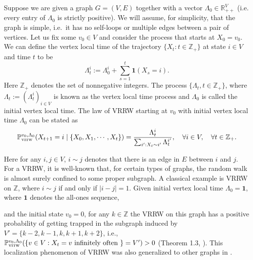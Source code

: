 \documentclass[a4paper, 11pt]{article}
\renewcommand{\P}{\mathbb{P}}
\newcommand{\Pvrrw}{\P_{\textnormal{vrrw}}}
\newcommand{\allone}{\mathbf{1}}
\newcommand{\ind}{\mathbf{1}}
\newif\ifva
\begin{document}
Suppose we are given a graph $G=(V, E)$ together with a vector $\Lambda_0 \in \mathbb{R}_{++}^V$
(i.e. every entry of $\Lambda_0$ is strictly positive).
We will assume, for simplicity, that the graph is simple, i.e.\, it has no self-loops or multiple edges between a pair of vertices. 
Let us fix some $v_0\in V$ and consider the process that starts at $X_0=v_0$. We can define the vertex local time of the trajectory $\{X_t:t\in\mathbb{Z}_+\}$ at state $i\in V$ and time $t$ to be 
\begin{equation}    \label{eqn:vertexlt}
\Lambda_t^i:=\Lambda_0^i+\sum_{s=1}^t \ind(X_s=i). 
\end{equation}
Here $\mathbb{Z}_+$ denotes the set of nonnegative integers. The process 
$\{\Lambda_t, t \in \mathbb{Z}_+\}$, where 
$\Lambda_t:=(\Lambda_t^i)_{i\in V}$ is known as the vertex local time process and $\Lambda_0$ is called the initial vertex local time. The law of VRRW starting at $v_0$ with initial vertex local time $\Lambda_0$ can be stated as
\[
\Pvrrw^{v_0, \Lambda_0}(X_{t+1}=i \mid \{X_0, X_1, \cdots, X_t\}) = \frac{\Lambda_t^{i}}{\sum_{i':X_t \sim i'} \Lambda_t^{i'}},\quad \forall i\in V,
\quad \forall t \in \mathbb{Z}_+.
\]

Here for any $i,j\in V$, $i\sim j$ denotes that there is an edge in $E$ between $i$ and $j$. For a VRRW, it is well-known that, for certain types of graphs, the random walk is almost surely confined to some proper subgraph. A classical example is VRRW on $\mathbb{Z}$, where $i\sim j$ if and only if $|i-j|=1$. Given initial vertex local time $\Lambda_0=\allone$, 
where $\allone$ denotes the all-ones 
sequence,
\ifva
\color{red}
\color{black}
\fi
and the initial state $v_0=0$, for any $k\in\mathbb{Z}$ the VRRW on this graph has a positive probability of getting trapped in the subgraph induced by $V'=\{k-2,k-1,k,k+1,k+2\}$, i.e., $\Pvrrw^{v_0, \Lambda_0}(\{v\in V: X_t=v\text{ infinitely often }\}=V')>0$ (Theorem 1.3, \cite{tarres}). This localization phenomenon of VRRW was also generalized to other graphs in \cite{volkov}.
\end{document}
